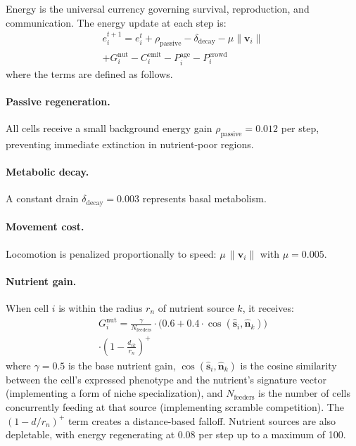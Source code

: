 \documentclass[10pt,twocolumn]{article}
\begin{document}
Energy is the universal currency governing survival, reproduction, and communication. The energy update at each step is:
\begin{multline}
  e_i^{t+1} = e_i^t + \rho_{\text{passive}} - \delta_{\text{decay}} - \mu \|\mathbf{v}_i\| \\
  + G_i^{\text{nut}} - C_i^{\text{emit}} - P_i^{\text{age}} - P_i^{\text{crowd}}
  \label{eq:energy}
\end{multline}
where the terms are defined as follows.

\paragraph{Passive regeneration.}
All cells receive a small background energy gain $\rho_{\text{passive}} = 0.012$ per step, preventing immediate extinction in nutrient-poor regions.

\paragraph{Metabolic decay.}
A constant drain $\delta_{\text{decay}} = 0.003$ represents basal metabolism.

\paragraph{Movement cost.}
Locomotion is penalized proportionally to speed: $\mu\, \|\mathbf{v}_i\|$ with $\mu = 0.005$.

\paragraph{Nutrient gain.}
When cell $i$ is within the radius $r_n$ of nutrient source $k$, it receives:
\begin{multline}
  G_i^{\text{nut}} = \frac{\gamma}{N_{\text{feeders}}} \cdot \big(0.6 + 0.4 \cdot \cos(\hat{\mathbf{s}}_i, \hat{\mathbf{n}}_k)\big) \\
  \cdot \left(1 - \frac{d_{ik}}{r_n}\right)^{\!+}
  \label{eq:nutrient}
\end{multline}
where $\gamma = 0.5$ is the base nutrient gain, $\cos(\hat{\mathbf{s}}_i, \hat{\mathbf{n}}_k)$ is the cosine similarity between the cell's expressed phenotype and the nutrient's signature vector (implementing a form of niche specialization), and $N_{\text{feeders}}$ is the number of cells concurrently feeding at that source (implementing scramble competition). The $(1-d/r_n)^+$ term creates a distance-based falloff. Nutrient sources are also depletable, with energy regenerating at 0.08 per step up to a maximum of 100.
\end{document}
